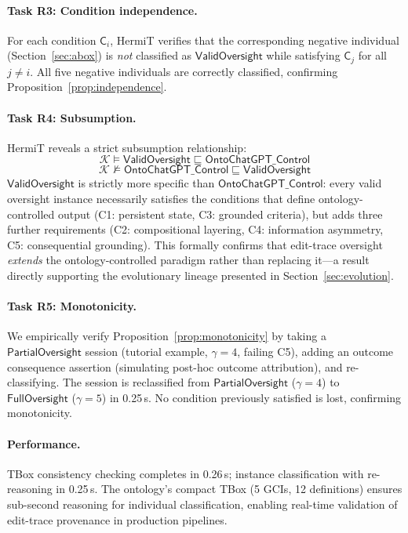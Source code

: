 \documentclass[11pt]{article}
\newcommand{\KB}{\ensuremath{\mathcal{K}}\xspace}
\newcommand{\sqsub}{\sqsubseteq}
\begin{document}
\paragraph{Task R3: Condition independence.}
For each condition $\mathsf{C}_i$, HermiT verifies that the corresponding negative individual (Section~\ref{sec:abox}) is \emph{not} classified as $\mathsf{ValidOversight}$ while satisfying $\mathsf{C}_j$ for all $j \neq i$.
All five negative individuals are correctly classified, confirming Proposition~\ref{prop:independence}.

\paragraph{Task R4: Subsumption.}
HermiT reveals a strict subsumption relationship:
\begin{equation}
  \KB \models \mathsf{ValidOversight} \sqsub \mathsf{OntoChatGPT\_Control}
\end{equation}
\begin{equation}
  \KB \not\models \mathsf{OntoChatGPT\_Control} \sqsub \mathsf{ValidOversight}
\end{equation}
$\mathsf{ValidOversight}$ is strictly more specific than $\mathsf{OntoChatGPT\_Control}$: every valid oversight instance necessarily satisfies the conditions that define ontology-controlled output (C1: persistent state, C3: grounded criteria), but adds three further requirements (C2: compositional layering, C4: information asymmetry, C5: consequential grounding).
This formally confirms that edit-trace oversight \emph{extends} the ontology-controlled paradigm rather than replacing it---a result directly supporting the evolutionary lineage presented in Section~\ref{sec:evolution}.

\paragraph{Task R5: Monotonicity.}
We empirically verify Proposition~\ref{prop:monotonicity} by taking a $\mathsf{PartialOversight}$ session (tutorial example, $\gamma = 4$, failing C5), adding an outcome consequence assertion (simulating post-hoc outcome attribution), and re-classifying.
The session is reclassified from $\mathsf{PartialOversight}$ ($\gamma = 4$) to $\mathsf{FullOversight}$ ($\gamma = 5$) in 0.25\,s.
No condition previously satisfied is lost, confirming monotonicity.

\paragraph{Performance.}
TBox consistency checking completes in 0.26\,s; instance classification with re-reasoning in 0.25\,s.
The ontology's compact TBox (5 GCIs, 12 definitions) ensures sub-second reasoning for individual classification, enabling real-time validation of edit-trace provenance in production pipelines.
\end{document}
